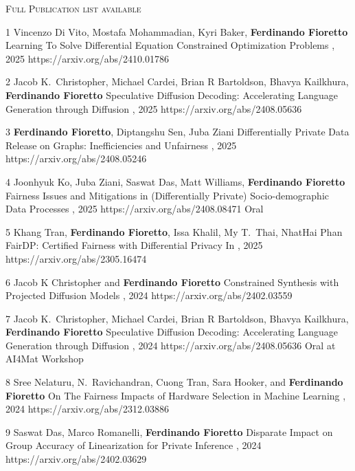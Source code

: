 \documentclass[localFont,alternative]{documentMETADATA}
\begin{document}
{\textsc{Full Publication list available  }}
\begin{pubs}

\confentryShort
	{1}
	{{Vincenzo Di Vito}, Mostafa Mohammadian, Kyri Baker, {\bf Ferdinando Fioretto}}
	{Learning To Solve Differential Equation Constrained Optimization Problems}
	{\procICLR, 2025}
	{https://arxiv.org/abs/2410.01786}

\confentryShort
	{2}
	{{Jacob K.~Christopher}, {Michael Cardei}, Brian R Bartoldson, Bhavya Kailkhura, {\bf Ferdinando Fioretto}}
	{Speculative Diffusion Decoding: Accelerating Language Generation through Diffusion}
	{\procNAACL, 2025}
	{https://arxiv.org/abs/2408.05636}

\confentryShort
	{3}
	{{\bf Ferdinando Fioretto}, Diptangshu Sen, Juba Ziani}
	{Differentially Private Data Release on Graphs: Inefficiencies and Unfairness}
	{\procAISTATS, 2025}
	{https://arxiv.org/abs/2408.05246}

\confentryShortAwd
	{4}
	{{Joonhyuk Ko}, Juba Ziani, {Saswat Das}, Matt Williams, {\bf Ferdinando Fioretto}}
	{Fairness Issues and Mitigations in (Differentially Private) Socio-demographic Data Processes}
	{\procAAAI, 2025}
	{https://arxiv.org/abs/2408.08471}
	{Oral}

\confentryShort
	{5}
	{Khang Tran, {\bf Ferdinando Fioretto}, Issa Khalil, My T.~Thai, NhatHai Phan}
	{FairDP: Certified Fairness with Differential Privacy}
	{In , 2025}
	{https://arxiv.org/abs/2305.16474}

\confentryShort
	{6}
	{Jacob K Christopher and {\bf Ferdinando Fioretto}}
	{Constrained Synthesis with Projected Diffusion Models}
	{\procNeurIPS, 2024}
	{https://arxiv.org/abs/2402.03559}

\confentryShortAwd
	{7}
	{Jacob K.~Christopher, Michael Cardei, Brian R Bartoldson, Bhavya Kailkhura, {\bf Ferdinando Fioretto}}
	{Speculative Diffusion Decoding: Accelerating Language Generation through Diffusion}
	{\procNeurIPS, 2024}
	{https://arxiv.org/abs/2408.05636}
	{Oral at AI4Mat Workshop}

\confentryShort
	{8}
	{Sree Nelaturu, N.~Ravichandran, Cuong Tran, Sara Hooker, and {\bf Ferdinando Fioretto}}
	{On The Fairness Impacts of Hardware Selection in Machine Learning}	
	{\procICML, 2024}
	{https://arxiv.org/abs/2312.03886}

\confentryShort
	{9}
	{Saswat Das, Marco Romanelli, {\bf Ferdinando Fioretto}}
	{Disparate Impact on Group Accuracy of Linearization for Private Inference}
	{\procICML, 2024}
	{https://arxiv.org/abs/2402.03629}
	

\end{pubs}
\end{document}
